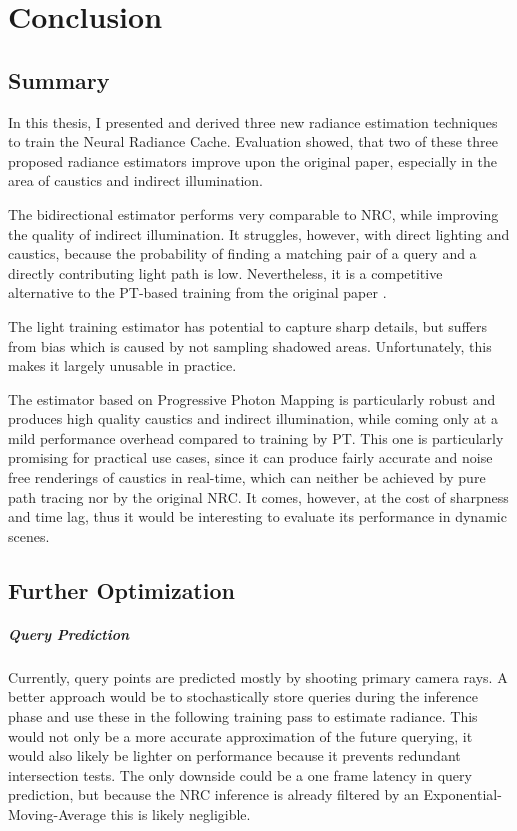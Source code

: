 
\chapter{Conclusion}
\label{chap:conclusion}

\section{Summary}
In this thesis, I presented and derived three new radiance estimation techniques to train the Neural Radiance Cache.
Evaluation showed, that two of these three proposed radiance estimators improve upon the original paper, especially in the area of caustics and indirect illumination.

The bidirectional estimator performs very comparable to NRC, while improving the quality of indirect illumination.
It struggles, however, with direct lighting and caustics, because the probability of finding a matching pair of a query and a directly contributing light path is low.
Nevertheless, it is a competitive alternative to the PT-based training from the original paper \parencite{muller2021}.

The light training estimator has potential to capture sharp details, but suffers from bias which is caused by not sampling shadowed areas.
Unfortunately, this makes it largely unusable in practice.

The estimator based on Progressive Photon Mapping is particularly robust and produces high quality caustics and indirect illumination, while coming only at a mild performance overhead compared to training by PT.
This one is particularly promising for practical use cases, since it can produce fairly accurate and noise free renderings of caustics in real-time, which can neither be achieved by pure path tracing nor by the original NRC.
It comes, however, at the cost of sharpness and time lag, thus it would be interesting to evaluate its performance in dynamic scenes.

\section{Further Optimization}

\paragraph{Query Prediction}
Currently, query points are predicted mostly by shooting primary camera rays.
A better approach would be to stochastically store queries during the inference phase and use these in the following training pass to estimate radiance.
This would not only be a more accurate approximation of the future querying, it would also likely be lighter on performance because it prevents redundant intersection tests.
The only downside could be a one frame latency in query prediction, but because the NRC inference is already filtered by an Exponential-Moving-Average this is likely negligible.

